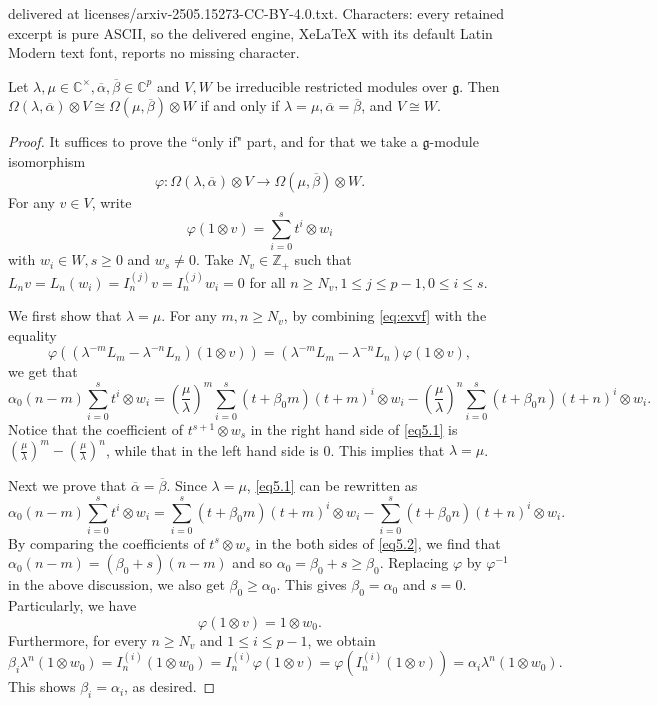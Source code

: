 \documentclass[10pt,a4paper]{amsart}
\def\al{\alpha}
\def\be{\beta}
\def\g{\mathfrak{g}}
\def\lmd{\lambda}
\def\vf{\varphi}
\newcommand{\C}{\mathbb C}
\newcommand{\Z}{\mathbb{Z}}
\newcommand{\elei}[2]{I_{#1}^{(#2)}}
\newcommand{\ov}[1]{\overline{#1}}
\begin{document}
delivered at licenses/arxiv-2505.15273-CC-BY-4.0.txt. Characters: every retained excerpt is pure ASCII, so the delivered engine, XeLaTeX with its default Latin Modern text font, reports no missing character.
\begin{proposition}\label{prop5.2}
 Let $\lmd,\mu\in\C^\times, \ov\al,\ov\beta\in\C^p$ and $V,W$ be irreducible restricted modules over $\g$.
 Then  $\Omega(\lmd,\ov\al)\otimes V\cong\Omega(\mu,\ov\beta)\otimes W$
 if and only if $\lmd=\mu, \ov\al=\ov\beta$, and $V\cong W$.
\end{proposition}

\begin{proof}
 It suffices to prove the ``only if" part, and for that we take a $\g$-module isomorphism
 \[\vf:\Omega(\lmd,\ov\al)\otimes V\longrightarrow\Omega(\mu,\ov\beta)\otimes W.\]
 For any $v\in V$, write
 \begin{equation}\label{eq:exvf}
    \vf(1\otimes v)=\sum_{i=0}^st^i\otimes w_i
 \end{equation} with $w_i\in W,s\geq 0$ and $w_s\neq 0$.
 Take $N_v\in\Z_+$ such that $L_nv=L_n(w_i)=\elei njv=\elei njw_i=0$ for all $n\geq N_v,1\leq j\leq p-1,0\leq i\leq s$.

 We first show that $\lambda=\mu$.
 For any $m,n\geq N_v$, by combining \eqref{eq:exvf} with the equality
 \[\vf\left(\left(\lmd^{-m}L_m-\lmd^{-n}L_n\right)(1\otimes v)\right)
     =\left(\lmd^{-m}L_m-\lmd^{-n}L_n\right)\vf(1\otimes v),\]
     we get that
 \begin{equation}\label{eq5.1}
   \al_0(n-m)\sum_{i=0}^st^i\otimes w_i
   =\left(\frac\mu\lmd\right)^m\sum_{i=0}^s(t+\be_0m)(t+m)^i\otimes w_i
     -\left(\frac\mu\lmd\right)^n\sum_{i=0}^s(t+\be_0n)(t+n)^i\otimes w_i.
 \end{equation}
 Notice that the coefficient of $t^{s+1}\otimes w_s$ in the right hand side of \eqref{eq5.1} is
 $\left(\frac\mu\lmd\right)^m-\left(\frac\mu\lmd\right)^n$, while that in the left hand side is 0.
This implies that  $\lmd=\mu$.

Next we prove that $\ov\alpha=\ov\beta$.
Since  $\lmd=\mu$, \eqref{eq5.1} can be rewritten as
 \begin{equation}\label{eq5.2}
   \al_0(n-m)\sum_{i=0}^st^i\otimes w_i=\sum_{i=0}^s(t+\be_0m)(t+m)^i\otimes w_i
          -\sum_{i=0}^s(t+\be_0n)(t+n)^i\otimes w_i.
 \end{equation}
By comparing  the coefficients of $t^s\otimes w_s$ in the both sides of \eqref{eq5.2}, we find that
 $\al_0(n-m)=(\be_0+s)(n-m)$ and so $\al_0=\be_0+s\geq \be_0$.
 Replacing $\vf$ by $\vf^{-1}$ in the above discussion, we also get $\be_0\geq \al_0$.
 This gives  $\be_0=\al_0$ and $s=0$. Particularly, we have  \[\vf(1\otimes v)=1\otimes w_0.\]
Furthermore, for every $n\geq N_v $ and $1\leq i\leq p-1$, we obtain
 $$\be_i\lmd^n(1\otimes w_0)=\elei ni(1\otimes w_0)=\elei ni\vf(1\otimes v)
      =\vf\left(\elei ni(1\otimes v)\right)=\al_i\lmd^n(1\otimes w_0).$$
This shows $\be_i=\al_i$, as desired.


\end{proof}
\end{document}
